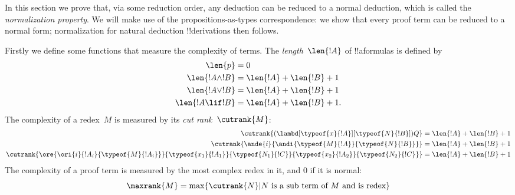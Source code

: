 \documentclass[../../../include/open-logic-section]{subfiles}
\begin{document}

In this section we prove that, via some reduction order, any deduction
can be reduced to a normal deduction, which is called the
\emph{normalization property}. We will make use of the
propositions-as-types correspondence: we show that every proof term
can be reduced to a normal form; normalization for natural deduction
!!{derivation}s then follows.

Firstly we define some functions that measure the complexity of terms.
The \emph{length}~$\len{!A}$ of !!a{formula}s is defined by
\begin{align*}
  \len{p} &= 0\\
  \len{!A \land !B} &= \len{!A} + \len{!B} + 1\\
  \len{!A \lor !B} &= \len{!A} + \len{!B} + 1 \\
  \len{!A \lif !B} &= \len{!A} + \len{!B} + 1.
\end{align*}
The complexity of a redex~$M$ is measured by its \emph{cut
  rank}~$\cutrank{M}$:
\begin{align*}
  \cutrank{(\lambd[\typeof{x}{!A}][\typeof{N}{!B}])Q} &=
  \len{!A} + \len{!B} + 1 \\
  \cutrank{\ande{i}{\andi{\typeof{M}{!A}}{\typeof{N}{!B}}}} &=
  \len{!A} + \len{!B} + 1 \\
  \cutrank{\ore{\ori{i}{!A_{i}}{\typeof{M}{!A_i}}}
    {\typeof{x_1}{!A_1}}{\typeof{N_1}{!C}}
    {\typeof{x_2}{!A_2}}{\typeof{N_2}{!C}}} &=
  \len{!A} + \len{!B} + 1
\end{align*}
The complexity of a proof term is measured by the most complex
redex in it, and $0$ if it is normal:
\[
  \maxrank{M} = \max \{\cutrank{N} | N \text{ is a sub term of } M \text{
    and is redex}\}
\]
\end{document}
